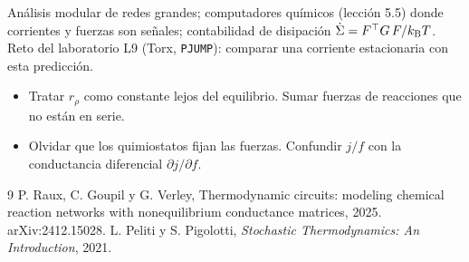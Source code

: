 \documentclass[11pt,a4paper]{article}
\begin{document}
\begin{aplicacion}
Análisis modular de redes grandes; computadores químicos (lección 5.5) donde corrientes y fuerzas son señales; contabilidad de disipación
$\dot\Sigma=F^\top G\,F/k_{\mathrm B} T$. Reto del laboratorio L9 (Torx, \texttt{PJUMP}): comparar una corriente estacionaria con esta predicción.
\end{aplicacion}

\begin{error}
\begin{itemize}[nosep]
\item Tratar $r_\rho$ como constante lejos del equilibrio. \quad Sumar fuerzas de reacciones que no están en serie.
\item Olvidar que los quimiostatos fijan las fuerzas. \quad Confundir $j/f$ con la conductancia diferencial $\partial j/\partial f$.
\end{itemize}
\end{error}

\begin{thebibliography}{9}\small
{} P. Raux, C. Goupil y G. Verley, Thermodynamic circuits: modeling chemical reaction networks with nonequilibrium conductance
matrices, 2025. arXiv:2412.15028.
 L. Peliti y S. Pigolotti, \emph{Stochastic Thermodynamics: An Introduction}, 2021.
\end{thebibliography}
\end{document}
